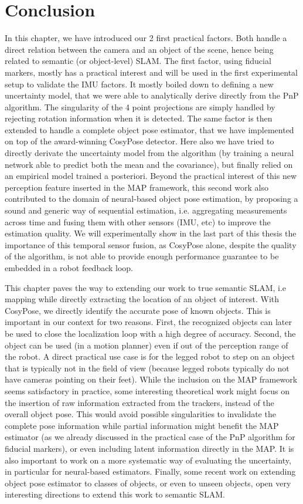 \section{Conclusion}

In this chapter, we have introduced our 2 first practical factors. Both
handle a direct relation between the camera and an object of the scene,
hence being related to semantic (or object-level) SLAM.
The first factor, using fiducial markers, mostly has a practical interest and
will be used in the first experimental setup to validate the IMU factors.
It mostly boiled down to defining a new uncertainty model, that we were able to
analytically derive directly from the PnP algorithm.
The singularity of the 4 point projections are simply handled by rejecting rotation
information when it is detected.
The same factor is then extended to handle a complete object pose estimator,
that we have implemented on top of the award-winning CosyPose detector.
Here also we have tried to directly derivate the uncertainty model from the
algorithm (by training a neural network able to predict both the mean and
the covariance), but finally relied on an empirical model trained a posteriori.
Beyond the practical interest of this new perception feature inserted in the
MAP framework, this second work also contributed to the domain of
neural-based object pose estimation, by proposing a sound and generic
way of sequential estimation, i.e. aggregating measurements across time and
fusing them with other sensors (IMU, etc) to improve the estimation quality.
We will experimentally show in the last part of this thesis the importance
of this temporal sensor fusion, as CosyPose alone, despite the quality of the
algorithm, is not able to provide enough performance guarantee to be
embedded in a robot feedback loop.

This chapter paves the way to extending our work to true semantic SLAM,
i.e mapping while directly extracting the location of an object of interest. With
CosyPose, we directly identify the accurate pose of known objects. This is
important in our context for two reasons. First, the recognized objects can
later be used to close the localization loop with a high degree of accuracy.
Second, the object can be used (\eg in a motion planner) even if out of the
perception range of the robot. A direct practical use case is for the legged
robot to step on an object that is typically not in the field of view (because
legged robots typically do not have cameras pointing on their feet).
While the inclusion on the MAP framework seems satisfactory in practice,
some interesting theoretical work might focus on the insertion of raw
information extracted from the trackers, instead of the overall object pose.
This would avoid possible singularities to invalidate the complete pose
information while partial information might benefit the MAP estimator
(as we already discussed in the practical case of the PnP algorithm for
fiducial markers), or even including latent information directly in the MAP.
It is also important to work on a more systematic way of evaluating the
uncertainty, in particular for neural-based estimators. Finally, some recent
work on extending object pose estimator to classes of objects, or even to
unseen objects, open very interesting directions to extend this work
to semantic SLAM.

